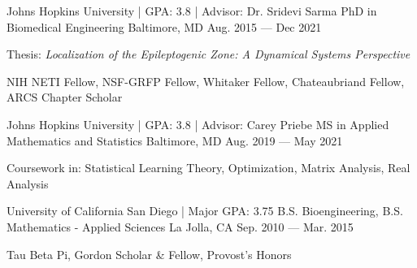 \begin{cventries}

 \cventry
    {Johns Hopkins University | GPA: 3.8 | Advisor: Dr. Sridevi Sarma} %
    {PhD in  Biomedical Engineering} %
    {Baltimore, MD} %
    {Aug. 2015 --- Dec 2021} %
    {
      \begin{cvitems} %
        \item {Thesis: \textit{Localization of the Epileptogenic Zone: A Dynamical Systems Perspective}}
        \item {NIH NETI Fellow, NSF-GRFP Fellow, Whitaker Fellow, Chateaubriand Fellow, ARCS Chapter Scholar}
      \end{cvitems}
    }
    \vspace{-0.15cm}
    
 \cventry
    {Johns Hopkins University | GPA: 3.8 | Advisor: Carey Priebe} %
    {MS in Applied Mathematics and Statistics} %
    {Baltimore, MD} %
    {Aug. 2019 --- May 2021} %
    {
      \begin{cvitems} %
        \item {Coursework in: Statistical Learning Theory, Optimization, Matrix Analysis, Real Analysis}
      \end{cvitems}
    }
    \vspace{0.15cm}
 \cventry
    {University of California San Diego | Major GPA: 3.75} %
    {B.S. Bioengineering, B.S. Mathematics - Applied Sciences} %
    {La Jolla, CA} %
    {Sep. 2010 --- Mar. 2015} %
    {
    \begin{cvitems} %
        \item {Tau Beta Pi, Gordon Scholar \& Fellow, Provost's Honors}
    \end{cvitems}
    }
    \vspace{-0.35cm}

\end{cventries}
